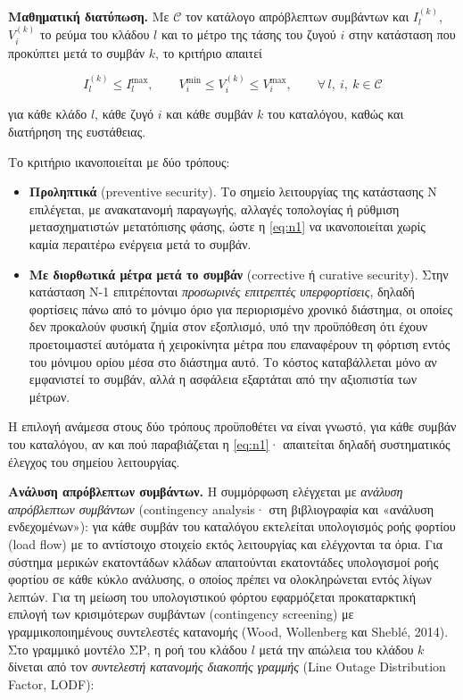 \textbf{Μαθηματική διατύπωση.} Με $\mathcal{C}$ τον κατάλογο απρόβλεπτων συμβάντων και
$I_l^{(k)}$, $V_i^{(k)}$ το ρεύμα του κλάδου $l$ και το μέτρο της τάσης του ζυγού $i$ στην
κατάσταση που προκύπτει μετά το συμβάν $k$, το κριτήριο απαιτεί

\begin{equation}
I_l^{(k)} \le I_l^{\max}, \qquad V_i^{\min} \le V_i^{(k)} \le V_i^{\max},
\qquad \forall\, l,\ i,\ k \in \mathcal{C}
\label{eq:n1}
\end{equation}

για κάθε κλάδο $l$, κάθε ζυγό $i$ και κάθε συμβάν $k$ του καταλόγου, καθώς και διατήρηση της
ευστάθειας.

Το κριτήριο ικανοποιείται με δύο τρόπους:

\begin{itemize}
\item \textbf{Προληπτικά} (preventive security). Το σημείο λειτουργίας της κατάστασης N
      επιλέγεται, με ανακατανομή παραγωγής, αλλαγές τοπολογίας ή ρύθμιση μετασχηματιστών
      μετατόπισης φάσης, ώστε η \eqref{eq:n1} να ικανοποιείται χωρίς καμία περαιτέρω ενέργεια
      μετά το συμβάν. 
\item \textbf{Με διορθωτικά μέτρα μετά το συμβάν} (corrective ή curative security). Στην
      κατάσταση N-1 επιτρέπονται \emph{προσωρινές επιτρεπτές υπερφορτίσεις}, δηλαδή φορτίσεις
      πάνω από το μόνιμο όριο για περιορισμένο χρονικό διάστημα, οι οποίες δεν προκαλούν φυσική
      ζημία στον εξοπλισμό, υπό την προϋπόθεση ότι έχουν προετοιμαστεί αυτόματα ή χειροκίνητα
      μέτρα που επαναφέρουν τη φόρτιση εντός του μόνιμου ορίου μέσα στο διάστημα αυτό. Το κόστος
      καταβάλλεται μόνο αν εμφανιστεί το συμβάν, αλλά η ασφάλεια εξαρτάται από την αξιοπιστία των
      μέτρων.
\end{itemize}

Η επιλογή ανάμεσα στους δύο τρόπους προϋποθέτει να είναι γνωστό, για κάθε συμβάν του
καταλόγου, αν και πού παραβιάζεται η \eqref{eq:n1}· απαιτείται δηλαδή συστηματικός έλεγχος του
σημείου λειτουργίας.

\textbf{Ανάλυση απρόβλεπτων συμβάντων.} Η συμμόρφωση ελέγχεται με \emph{ανάλυση απρόβλεπτων
συμβάντων} (contingency analysis· στη βιβλιογραφία και «ανάλυση ενδεχομένων»): για κάθε
συμβάν του καταλόγου εκτελείται υπολογισμός ροής φορτίου (load flow) με το αντίστοιχο
στοιχείο εκτός λειτουργίας και ελέγχονται τα όρια. Για σύστημα μερικών εκατοντάδων κλάδων
απαιτούνται εκατοντάδες υπολογισμοί ροής φορτίου σε κάθε κύκλο ανάλυσης, ο οποίος πρέπει να
ολοκληρώνεται εντός λίγων λεπτών. Για τη μείωση του υπολογιστικού φόρτου εφαρμόζεται
προκαταρκτική επιλογή των κρισιμότερων συμβάντων (contingency screening) με γραμμικοποιημένους
συντελεστές κατανομής (Wood, Wollenberg και Sheblé, 2014). Στο γραμμικό μοντέλο ΣΡ, η ροή του κλάδου $l$ μετά την απώλεια του
κλάδου $k$ δίνεται από τον \emph{συντελεστή κατανομής διακοπής γραμμής} (Line Outage
Distribution Factor, LODF):

